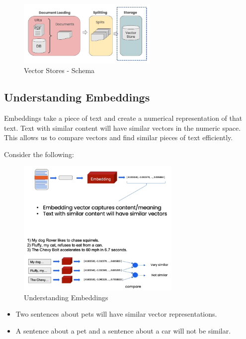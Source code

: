 \documentclass{article}
\begin{document}
\begin{figure}[H]
    \centering
    \includegraphics[width=0.6\textwidth]{images/langchain_chat_with_your_data_008.png}
    \caption{Vector Stores - Schema}
    \label{fig:vector_stores_schema}
\end{figure}

\subsection{Understanding Embeddings}

Embeddings take a piece of text and create a numerical representation of that text. Text with similar content will have similar vectors in the numeric space. This allows us to compare vectors and find similar pieces of text efficiently.

Consider the following:

\begin{figure}[H]
    \centering
    \includegraphics[width=0.7\textwidth]{images/langchain_chat_with_your_data_009.png}
    \caption{Understanding Embeddings}
    \label{fig:understanding_embeddings}
\end{figure}

\begin{itemize}
    \item Two sentences about pets will have similar vector representations.
    \item A sentence about a pet and a sentence about a car will not be similar.
\end{itemize}
\end{document}
